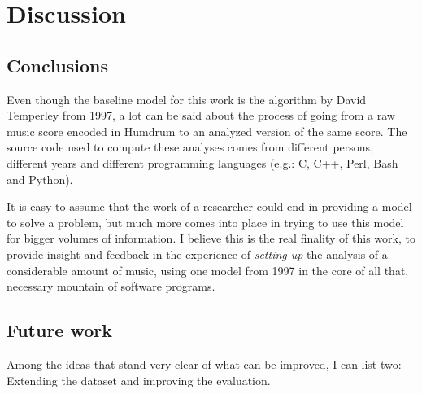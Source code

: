 \chapter{Discussion}
\label{chap:discussion}

\section{Conclusions}
Even though the baseline model for this work is the algorithm by David Temperley from 1997, a lot can be said about the process of going from a raw music score encoded in Humdrum to an analyzed version of the same score. The source code used to compute these analyses comes from different persons, different years and different programming languages (e.g.: C, C++, Perl, Bash and Python).

It is easy to assume that the work of a researcher could end in providing a model to solve a problem, but much more comes into place in trying to use this model for bigger volumes of information. I believe this is the real finality of this work, to provide insight and feedback in the experience of \emph{setting up} the analysis of a considerable amount of music, using one model from 1997 in the core of all that, necessary mountain of software programs.

\section{Future work}
  Among the ideas that stand very clear of what can be improved, I can list two: Extending the dataset and improving the evaluation.
